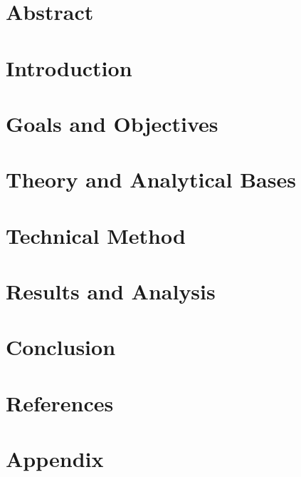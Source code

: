 \documentclass[a4paper,12pt,twocolumn]{article}
\begin{document}
	\pagebreak
	\section{Abstract}\label{sec:abstract}
	
	
	\section{Introduction}\label{sec:introduction}
	

	\section{Goals and Objectives}\label{sec:objectives}
	

	\section{Theory and Analytical Bases}\label{sec:theory}
	

	\section{Technical Method}\label{sec:methods}
	

	\section{Results and Analysis}\label{sec:results}
	

	\section{Conclusion}\label{sec:conclusion}
	

	\section{References}
	\printbibliography
	\onecolumn
	\section{Appendix}\label{sec:appendix}
	
	
\end{document}
